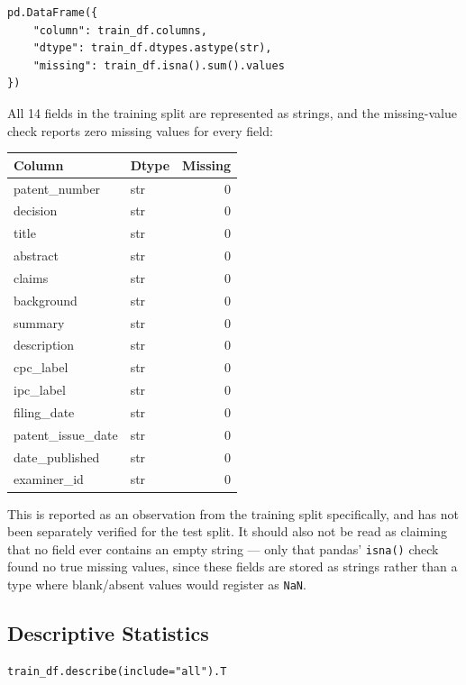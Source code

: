 \documentclass[11pt]{article}
\begin{document}
\begin{lstlisting}
pd.DataFrame({
    "column": train_df.columns,
    "dtype": train_df.dtypes.astype(str),
    "missing": train_df.isna().sum().values
})
\end{lstlisting}

\noindent All 14 fields in the training split are represented as strings, and the missing-value check reports zero missing values for every field:

\begin{longtable}{|l|l|r|}
\hline
\textbf{Column} & \textbf{Dtype} & \textbf{Missing} \\
\hline
\endhead
patent\_number     & str & 0 \\ \hline
decision           & str & 0 \\ \hline
title              & str & 0 \\ \hline
abstract           & str & 0 \\ \hline
claims             & str & 0 \\ \hline
background         & str & 0 \\ \hline
summary            & str & 0 \\ \hline
description        & str & 0 \\ \hline
cpc\_label         & str & 0 \\ \hline
ipc\_label         & str & 0 \\ \hline
filing\_date       & str & 0 \\ \hline
patent\_issue\_date & str & 0 \\ \hline
date\_published    & str & 0 \\ \hline
examiner\_id       & str & 0 \\ \hline
\end{longtable}

\noindent This is reported as an observation from the training split specifically, and has not been separately verified for the test split. It should also not be read as claiming that no field ever contains an empty string --- only that pandas' \texttt{isna()} check found no true missing values, since these fields are stored as strings rather than a type where blank/absent values would register as \texttt{NaN}.

\subsection{Descriptive Statistics}

\begin{lstlisting}
train_df.describe(include="all").T
\end{lstlisting}
\end{document}
